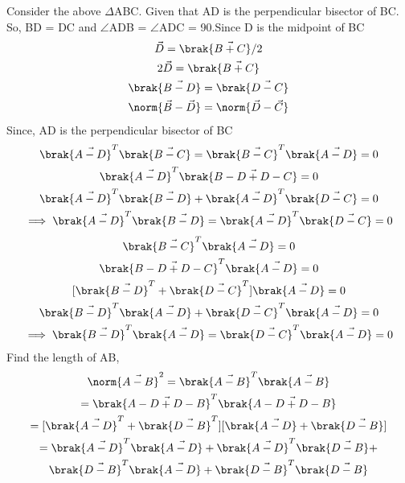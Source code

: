 \begin{figure}[!ht]
\begin{center}
\resizebox{\columnwidth}{!}{}
\end{center}
\caption{}
\label{eq:solutions/1/29/fig:es17btech11009_fig1}
\end{figure}
Consider the above $\Delta$ABC. Given that AD is the perpendicular bisector of BC. So, BD = DC and $\angle$ADB = $\angle$ADC = 90.Since D is the midpoint of BC
\begin{multline}
    \vec{D} = \brak{\vec{B+C}}/2\\
    2\vec{D} = \brak{\vec{B+C}}\\
    \brak{\vec{B-D}} = \brak{\vec{D-C}}\\
    \norm{\vec{B}-\vec{D}}=\norm{\vec{D}-\vec{C}}\label{eq:solutions/1/29/eq:es17btech11009_1}
\end{multline}
Since, AD is the perpendicular bisector of BC
\begin{multline}
    \brak{\vec{A-D}}^T\brak{\vec{B-C}} =\brak{\vec{B-C}}^T\brak{\vec{A-D}} = 0\\
    \brak{\vec{A-D}}^T\brak{\vec{B-D+D-C}} = 0\\
    \brak{\vec{A-D}}^T\brak{\vec{B-D}} + \brak{\vec{A-D}}^T\brak{\vec{D-C}} = 0\\
    \implies\brak{\vec{A-D}}^T\brak{\vec{B-D}}=\brak{\vec{A-D}}^T\brak{\vec{D-C}} = 0\label{eq:solutions/1/29/eq:es17btech11009_2}
\end{multline}
\begin{multline}
    \brak{\vec{B-C}}^T\brak{\vec{A-D}} = 0\\
    \brak{\vec{B-D+D-C}}^T\brak{\vec{A-D}} = 0\\
    [\brak{\vec{B-D}}^T + \brak{\vec{D-C}}^T]\brak{\vec{A-D}} = 0\\
    \brak{\vec{B-D}}^T\brak{\vec{A-D}} + \brak{\vec{D-C}}^T\brak{\vec{A-D}} = 0\\
    \implies\brak{\vec{B-D}}^T\brak{\vec{A-D}}=\brak{\vec{D-C}}^T\brak{\vec{A-D}}= 0\label{eq:solutions/1/29/eq:es17btech11009_3}
\end{multline}
Find the length of AB,
\begin{multline}
 \norm{\vec{A-B}}^2=\brak{\vec{A-B}}^{T}\brak{\vec{A-B}}\\ =\brak{\vec{A-D+D-B}}^{T}\brak{\vec{A-D+D-B}}\\
 = [\brak{\vec{A-D}}^{T}+\brak{\vec{D-B}}^{T}][\brak{\vec{A-D}}+\brak{\vec{D-B}}]\\
 =\brak{\vec{A-D}}^{T}\brak{\vec{A-D}} + \brak{\vec{A-D}}^{T}\brak{\vec{D-B}} +\\ \brak{\vec{D-B}}^{T}\brak{\vec{A-D}} + \brak{\vec{D-B}}^{T}\brak{\vec{D-B}}
\end{multline}

